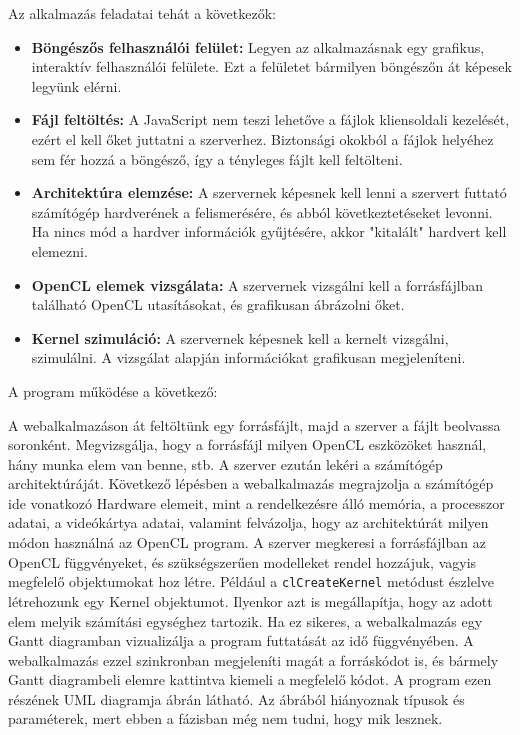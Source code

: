 Az alkalmazás feladatai tehát a következők:
\begin{itemize}
\item\textbf{Böngészős felhasználói felület:} Legyen az alkalmazásnak egy grafikus, interaktív felhasználói felülete. Ezt a felületet bármilyen böngészőn át képesek legyünk elérni.
\item\textbf{Fájl feltöltés:} A JavaScript nem teszi lehetőve a fájlok kliensoldali kezelését, ezért el kell őket juttatni a szerverhez. Biztonsági okokból a fájlok helyéhez sem fér hozzá a böngésző, így a tényleges fájlt kell feltölteni.
\item\textbf{Architektúra elemzése:} A szervernek képesnek kell lenni a szervert futtató számítógép hardverének a felismerésére, és abból következtetéseket levonni. Ha nincs mód a hardver információk gyűjtésére, akkor "kitalált" hardvert kell elemezni.
\item\textbf{OpenCL elemek vizsgálata:} A szervernek vizsgálni kell a forrásfájlban található OpenCL utasításokat, és grafikusan ábrázolni őket.
\item\textbf{Kernel szimuláció:} A szervernek képesnek kell a kernelt vizsgálni, szimulálni. A vizsgálat alapján információkat grafikusan megjeleníteni.
\end{itemize}





A program működése a következő:

A webalkalmazáson át feltöltünk egy forrásfájlt, majd a szerver a fájlt beolvassa soronként. Megvizsgálja, hogy a forrásfájl milyen OpenCL eszközöket használ, hány munka elem van benne, stb. A szerver ezután lekéri a számítógép architektúráját. Következő lépésben a webalkalmazás megrajzolja a számítógép ide vonatkozó Hardware elemeit, mint a rendelkezésre álló memória, a processzor adatai, a videókártya adatai, valamint felvázolja, hogy az architektúrát milyen módon használná az OpenCL program. A szerver megkeresi a forrásfájlban az OpenCL függvényeket, és szükségszerűen modelleket rendel hozzájuk, vagyis megfelelő objektumokat hoz létre. Például a \texttt{clCreateKernel} metódust észlelve létrehozunk egy Kernel objektumot. Ilyenkor azt is megállapítja, hogy az adott elem melyik számítási egységhez tartozik. Ha ez sikeres, a webalkalmazás egy Gantt diagramban vizualizálja a program futtatását az idő függvényében. A webalkalmazás ezzel szinkronban megjeleníti magát a forráskódot is, és bármely Gantt diagrambeli elemre kattintva kiemeli a megfelelő kódot. A program ezen részének UML diagramja  ábrán látható. Az ábrából hiányoznak típusok és paraméterek, mert ebben a fázisban még nem tudni, hogy mik lesznek.


